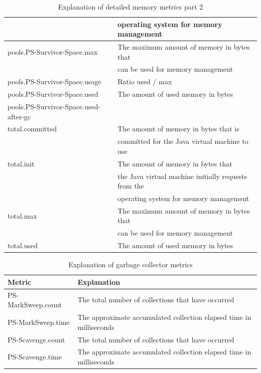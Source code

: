\documentclass{seal_thesis}
\begin{document}
\begin{table}[ht]
\begin{tabular}{|l|l|}
							& operating system for memory management \\ \hline
pools.PS-Survivor-Space.max & The maximum amount of memory in bytes that \\
							& can be used for memory management \\ \hline
pools.PS-Survivor-Space.usage & Ratio used / max \\ \hline
pools.PS-Survivor-Space.used & The amount of used memory in bytes \\ \hline
pools.PS-Survivor-Space.used-after-gc & \\ \hline
total.committed & The amount of memory in bytes that is \\
									& committed for the Java virtual machine to use \\ \hline
total.init & The amount of memory in bytes that \\
							& the Java virtual machine initially requests from the \\
							& operating system for memory management \\ \hline
total.max & The maximum amount of memory in bytes that \\
							& can be used for memory management \\ \hline
total.used & The amount of used memory in bytes \\ \hline
\end{tabular}
\caption{Explanation of detailed memory metrics part 2}
\label{tab:detailed-heap_metrics2}
\end{table}






\begin{table}[ht]
\centering
\begin{tabular}{|l|l|}
\hline
\textbf{Metric} & \textbf{Explanation} \\ \hline
PS-MarkSweep.count & The total number of collections that have occurred\\ \hline
PS-MarkSweep.time & The approximate accumulated collection elapsed time in milliseconds\\ \hline
PS-Scavenge.count & The total number of collections that have occurred \\ \hline
PS-Scavenge.time & The approximate accumulated collection elapsed time in milliseconds\\ \hline
\end{tabular}
\caption{Explanation of garbage collector metrics}
\label{tab:garbage-collector_metrics}
\end{table}
\end{document}
